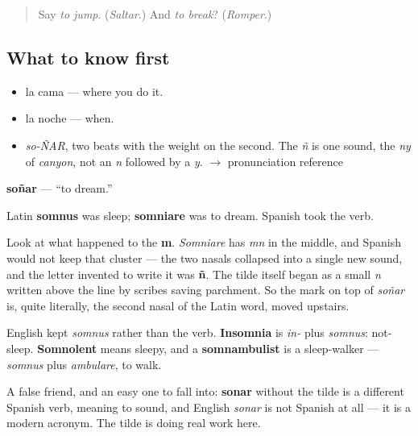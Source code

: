 \label{lesson:ES-C381-sonar}



\begin{quote}
Say \emph{to jump}. (\emph{Saltar}.) And \emph{to break}? (\emph{Romper}.)
\end{quote}

\subsection*{What to know first}
\begin{itemize}
\raggedright
  \item la cama — where you do it.
  \item la noche — when.
\end{itemize}

\begin{sounds}
\begin{itemize}
\raggedright
  \item \emph{so-ÑAR}, two beats with the weight on the second. The \emph{ñ} is one sound, the \emph{ny} of \emph{canyon}, not an \emph{n} followed by a \emph{y}. $\to$ pronunciation reference
\end{itemize}
\end{sounds}

\begin{cousinweb}
\textbf{soñar} — \textquotedblleft{}to dream.\textquotedblright{}

Latin \textbf{somnus} was sleep; \textbf{somniare} was to dream. Spanish took the verb.

Look at what happened to the \textbf{m}. \emph{Somniare} has \emph{mn} in the middle, and Spanish would not keep that cluster — the two nasals collapsed into a single new sound, and the letter invented to write it was \textbf{ñ}. The tilde itself began as a small \emph{n} written above the line by scribes saving parchment. So the mark on top of \emph{soñar} is, quite literally, the second nasal of the Latin word, moved upstairs.

English kept \emph{somnus} rather than the verb. \textbf{Insomnia} is \emph{in-} plus \emph{somnus}: not-sleep. \textbf{Somnolent} means sleepy, and a \textbf{somnambulist} is a sleep-walker — \emph{somnus} plus \emph{ambulare}, to walk.

A false friend, and an easy one to fall into: \textbf{sonar} without the tilde is a different Spanish verb, meaning to sound, and English \emph{sonar} is not Spanish at all — it is a modern acronym. The tilde is doing real work here.
\end{cousinweb}

